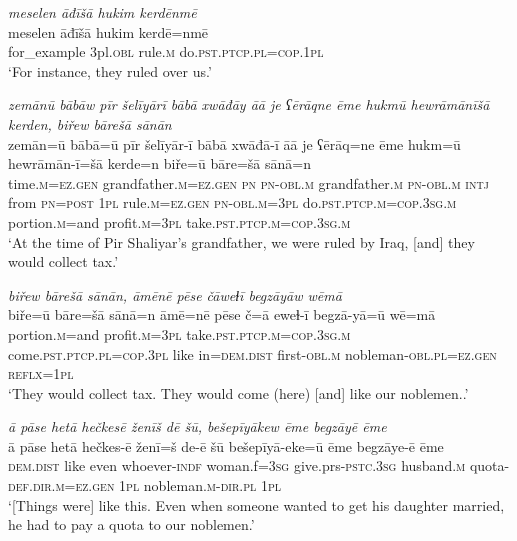 \ea \label{BP.10}
\textit{meselen āđīšā hukim kerdēnmē} \\ 
\gll meselen āđīšā hukim kerdē=nmē \\ 
 for\_example 3pl\textsc{.obl} rule\textsc{.m} do\textsc{.pst}\textsc{.ptcp}\textsc{.pl}\textsc{=cop}\textsc{.\textsc{1pl}} \\ 
\glt `For instance, they ruled over us.'
\z 
 
\ea \label{BP.11}
\textit{zemānū bābāw pīr šelīyārī bābā xwāđāy āā je ʕērāqne ēme hukmū hewrāmānīšā kerden, biřew bārešā sānān} \\ 
\gll zemān=ū bābā=ū pīr šelīyār-ī bābā xwāđā-ī āā je ʕērāq=ne ēme hukm=ū hewrāmān-ī=šā kerde=n biře=ū bāre=šā sānā=n \\ 
 time\textsc{.m}\textsc{=ez.gen} grandfather\textsc{.m}\textsc{=ez.gen} \textsc{pn} \textsc{pn}\textsc{-obl}\textsc{.m} grandfather\textsc{.m} \textsc{pn}\textsc{-obl}\textsc{.m} \textsc{intj} from \textsc{pn}\textsc{=\textsc{post}} \textsc{1pl} rule\textsc{.m}\textsc{=ez.gen} \textsc{pn}\textsc{-obl}\textsc{.m}\textsc{=3pl} do\textsc{.pst}\textsc{.ptcp}\textsc{.m}\textsc{=cop}\textsc{.3sg}\textsc{.m} portion\textsc{.m}=and profit\textsc{.m}\textsc{=3pl} take\textsc{.pst}\textsc{.ptcp}\textsc{.m}\textsc{=cop}\textsc{.3sg}\textsc{.m} \\ 
\glt `At the time of Pir Shaliyar’s grandfather, we were ruled by Iraq, [and] they would collect tax.'
\z 
 
\ea \label{BP.12}
\textit{biřew bārešā sānān, āmēnē pēse čāweɫī begzāyāw wēmā} \\ 
\gll biře=ū bāre=šā sānā=n āmē=nē pēse č=ā eweɫ-ī begzā-yā=ū wē=mā \\ 
 portion\textsc{.m}=and profit\textsc{.m}\textsc{=3pl} take\textsc{.pst}\textsc{.ptcp}\textsc{.m}\textsc{=cop}\textsc{.3sg}\textsc{.m} come\textsc{.pst}\textsc{.ptcp}\textsc{.pl}\textsc{=cop}\textsc{.3pl} like in=\textsc{dem.dist} first\textsc{-obl}\textsc{.m} nobleman\textsc{-obl}\textsc{.pl}\textsc{=ez.gen} \textsc{reflx}\textsc{=\textsc{1pl}} \\ 
\glt `They would collect tax. They would come (here) [and] like our noblemen..'
\z 
 
\ea \label{BP.17}
\textit{ā pāse hetā hečkesē ženīš dē šū, bešepīyākew ēme begzāyē ēme} \\ 
\gll ā pāse hetā hečkes-ē ženī=š de-ē šū bešepīyā-eke=ū ēme begzāye-ē ēme \\ 
 \textsc{dem.dist} like even whoever\textsc{-indf} woman.f\textsc{=3sg} give.prs\textsc{-pstc}\textsc{.3sg} husband\textsc{.m} quota\textsc{-def}\textsc{.dir}\textsc{.m}\textsc{=ez.gen} \textsc{1pl} nobleman\textsc{.m}\textsc{-dir}\textsc{.pl} \textsc{1pl} \\ 
\glt `[Things were] like this. Even when someone wanted to get his daughter married, he had to pay a quota  to our noblemen.'
\z 
 
